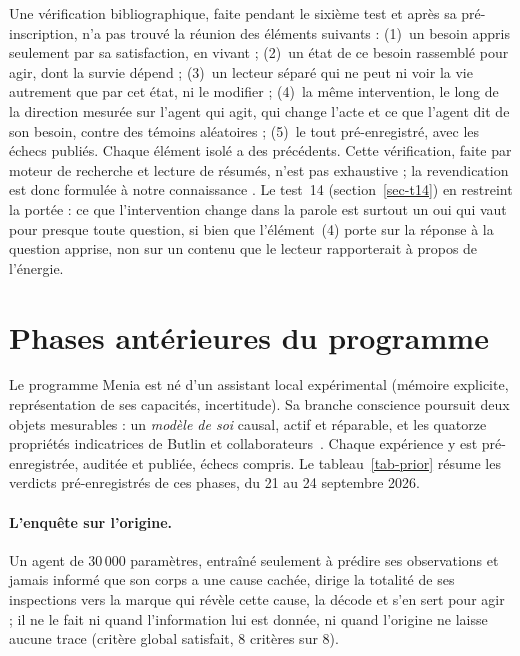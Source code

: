 \documentclass[11pt,a4paper]{article}
\begin{document}
Une vérification bibliographique, faite pendant le sixième test et après sa
pré-inscription, n'a pas trouvé la réunion des éléments suivants : (1)~un besoin
appris seulement par sa satisfaction, en vivant ; (2)~un état de ce besoin
rassemblé pour agir, dont la survie dépend ; (3)~un lecteur séparé qui ne peut
ni voir la vie autrement que par cet état, ni le modifier ; (4)~la même
intervention, le long de la direction mesurée sur l'agent qui agit, qui change
l'acte et ce que l'agent dit de son besoin, contre des témoins aléatoires ;
(5)~le tout pré-enregistré, avec les échecs publiés. Chaque élément isolé a des
précédents. Cette vérification, faite par moteur de recherche et lecture de
résumés, n'est pas exhaustive ; la revendication est donc formulée \og à notre
connaissance \fg{}. Le test~14 (section~\ref{sec-t14}) en restreint la portée : ce que
l'intervention change dans la parole est surtout un \og oui \fg{} qui vaut pour presque
toute question, si bien que l'élément~(4) porte sur la réponse à la question apprise,
non sur un contenu que le lecteur rapporterait à propos de l'énergie.

\section{Phases antérieures du programme}
\label{sec-prior}

Le programme Menia est né d'un assistant local expérimental (mémoire explicite,
représentation de ses capacités, incertitude). Sa branche \og conscience \fg{}
poursuit deux objets mesurables : un \emph{modèle de soi} causal, actif et
réparable, et les quatorze propriétés indicatrices de Butlin et
collaborateurs~\cite{butlin2023}. Chaque expérience y est pré-enregistrée,
auditée et publiée, échecs compris. Le tableau~\ref{tab-prior} résume les
verdicts pré-enregistrés de ces phases, du 21 au 24 septembre 2026.

\paragraph{L'enquête sur l'origine.} Un agent de 30\,000 paramètres, entraîné
seulement à prédire ses observations et jamais informé que son corps a une
cause cachée, dirige la totalité de ses inspections vers la marque qui révèle
cette cause, la décode et s'en sert pour agir ; il ne le fait ni quand
l'information lui est donnée, ni quand l'origine ne laisse aucune trace
(critère global satisfait, 8 critères sur 8).
\end{document}
